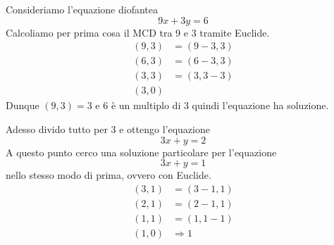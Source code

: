 \begin{example}
	Consideriamo l'equazione diofantea
	\begin{equation*}
		9x + 3y = 6
	\end{equation*}
	Calcoliamo per prima cosa il MCD tra 9 e 3 tramite Euclide.
	\begin{equation*}
		\begin{array}{ll}
			(9, 3) & = (9 - 3, 3) \\
			(6, 3) & = (6 - 3, 3) \\
			(3, 3) & = (3, 3 - 3) \\
			(3, 0)
		\end{array}
	\end{equation*}
	Dunque $(9, 3) = 3$ e 6 \`e un multiplo di 3 quindi l'equazione ha soluzione.

	Adesso divido tutto per 3 e ottengo l'equazione
	\begin{equation*}
		3x + y = 2
	\end{equation*}
	A questo punto cerco una soluzione particolare per l'equazione
	\begin{equation*}
		3x + y = 1
	\end{equation*}
	nello stesso modo di prima, ovvero con Euclide.
	\begin{equation*}
		\begin{array}{ll}
			(3, 1) & = (3 - 1, 1)  \\
			(2, 1) & = (2 - 1, 1)  \\
			(1, 1) & = (1, 1 - 1)  \\
			(1, 0) & \Rightarrow 1
		\end{array}
	\end{equation*}


\end{example}
